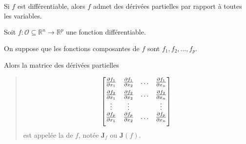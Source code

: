 \documentclass[letterpaper,11pt,english]{sphinxmanual}
\begin{document}
\begin{DUlineblock}{0em}
\item[]  Si \(f\) est différentiable, alors \(f\) admet des
dérivées partielles par rapport à toutes les variables.
\item[]  Soit
\(f: \mathcal{O}\subseteq\mathbb{R}^n \rightarrow \mathbb{R}^p\)
une fonction différentiable.
\item[] On suppose que les fonctions composantes de \(f\) sont
\(f_1, f_2, \dots, f_p\).
\item[] Alors la matrice des dérivées partielles
\end{DUlineblock}
\begin{quote}
\begin{equation}\label{equation:chapter2:chapter2:29}
\begin{split}\begin{bmatrix}
\frac{\partial f_1}{\partial x_1} & \frac{\partial f_1}{\partial x_2} &\dots & \frac{\partial f_1}{\partial x_n}\\[0.2cm]
\frac{\partial f_2}{\partial x_1} & \frac{\partial f_2}{\partial x_2} &\dots & \frac{\partial f_2}{\partial x_n}\\
\vdots&\vdots& & \vdots\\\vspace{0.2cm}
\frac{\partial f_p}{\partial x_1} & \frac{\partial f_p}{\partial x_2} &\dots & \frac{\partial f_p}{\partial x_n}
\end{bmatrix}\end{split}
\end{equation}
\sphinxAtStartPar
est appelée la  de \(f\), notée
\(\mathbf{J}_f\) ou \(\mathbf{J}(f)\).
\end{quote}
\end{document}
